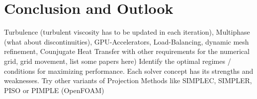 \section{Conclusion and Outlook}
Turbulence (turbulent viscosity has to be updated in each iteration), Multiphase (what about discontinuities), GPU-Accelerators, Load-Balancing, dynamic mesh refinement, Counjugate Heat Transfer with other requirements for the numerical grid, grid movement, list some papers here)
Identify the optimal regimes / conditions for maximizing performance. Each solver concept has its strengths and weaknesses.
Try other variants of Projection Methods like SIMPLEC, SIMPLER, PISO or PIMPLE (OpenFOAM)
